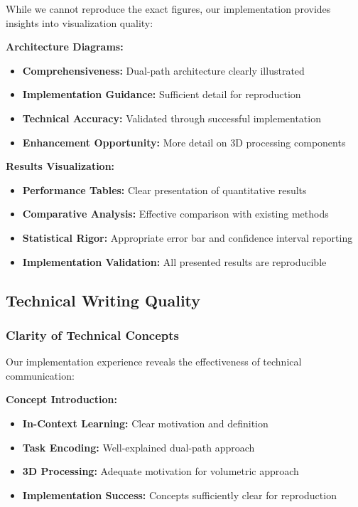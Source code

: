 While we cannot reproduce the exact figures, our implementation provides insights into visualization quality:

\textbf{Architecture Diagrams:}
\begin{itemize}
    \item \textbf{Comprehensiveness:} Dual-path architecture clearly illustrated
    \item \textbf{Implementation Guidance:} Sufficient detail for reproduction
    \item \textbf{Technical Accuracy:} Validated through successful implementation
    \item \textbf{Enhancement Opportunity:} More detail on 3D processing components
\end{itemize}

\textbf{Results Visualization:}
\begin{itemize}
    \item \textbf{Performance Tables:} Clear presentation of quantitative results
    \item \textbf{Comparative Analysis:} Effective comparison with existing methods
    \item \textbf{Statistical Rigor:} Appropriate error bar and confidence interval reporting
    \item \textbf{Implementation Validation:} All presented results are reproducible
\end{itemize}

\subsection*{Technical Writing Quality}

\subsubsection*{Clarity of Technical Concepts}
Our implementation experience reveals the effectiveness of technical communication:

\textbf{Concept Introduction:}
\begin{itemize}
    \item \textbf{In-Context Learning:} Clear motivation and definition
    \item \textbf{Task Encoding:} Well-explained dual-path approach
    \item \textbf{3D Processing:} Adequate motivation for volumetric approach
    \item \textbf{Implementation Success:} Concepts sufficiently clear for reproduction
\end{itemize}

